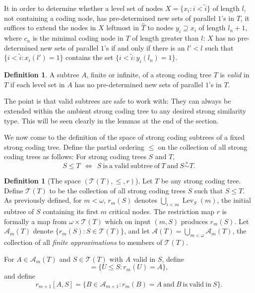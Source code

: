 \documentclass{amsart}
\theoremstyle{remark}
\theoremstyle{definition}
\newtheorem{defn}[thm]{Definition}
\theoremstyle{remark}
\newcommand{\om}{\omega}
\newcommand{\contains}{\supseteq}
\DeclareMathOperator{\Lev}{Lev}
\newcommand{\ssim}{\stackrel{s}{\sim}}
\begin{document}
It in order to determine whether  a level set of nodes $X=\{x_i:i<\tilde{i}\}$ of length $l$, not containing a coding node,  has pre-determined new sets of  parallel $1$'s in $T$,
it
suffices to extend the nodes in $X$
 leftmost in $\widehat{T}$ to nodes $y_i\contains x_i$ of   length $l_n+1$, where $c_n$ is the
minimal
 coding node in $T$ of length greater than $l$:
 $X$
 has no pre-determined new sets of  parallel $1$'s
 if and only if
 there is an $l'<l$ such that
$\{i<\tilde{i}:x_i(l')=1\}$ contains the set  $\{i<\tilde{i}:y_i(l_n)=1\}$.




\begin{defn}\label{defn.valid}
A subtree  $A$, finite or infinite, of a strong coding tree $T$ is {\em valid} in $T$ if
 each level set in $A$ has no pre-determined new sets of parallel $1$'s in $T$.
\end{defn}



The  point is that valid subtrees are safe to work with:
They can always be extended within the ambient strong coding tree to any desired strong similarity type.
This will be seen clearly in the lemmas at the end of the section.



We now come to the definition of the space of strong coding subtrees of a fixed strong coding tree.
Define the
 partial ordering  $\le$  on the collection of all strong coding trees  as follows:
For  strong coding trees $S$ and $T$,
\begin{equation}
 S\le T\ \  \Longleftrightarrow\ \  S \mathrm{\ is\ a\  valid\ subtree\ of\ }T\mathrm{\ and\ }  S\ssim T.
\end{equation}


\begin{defn}[The space $(\mathcal{T}(T),\le,r)$]\label{AT}
Let $T$ be any  strong coding  tree.
Define  $\mathcal{T}(T)$  to be the collection of all
strong coding trees $S$ such that $S\le T$.
As previously defined, for $m<\om$,
$r_m(S)$ denotes $\bigcup_{i<m}\Lev_S(m)$,
 the initial subtree of $S$ containing its first $m$ critical nodes.
The restriction map $r$ is formally a map from $\om\times \mathcal{T}(T)$ which on  input $(m,S)$ produces $r_m(S)$.
Let
$\mathcal{A}_m(T)$ denote $\{r_m(S):S\in\mathcal{T}(T)\}$, and let
$\mathcal{A}(T)=\bigcup_{m<\om}\mathcal{A}_m(T)$,
the collection of all {\em finite approximations} to members of $\mathcal{T}(T)$.


For $A\in\mathcal{A}_m(T)$ and
$S\in\mathcal{T}(T)$ with $A$ valid in $S$,
define
\begin{equation}
[A,S]=\{U\le S: r_m(U)=A\},
\end{equation}
and define
\begin{equation}
r_{m+1}[A,S]=\{B\in \mathcal{A}_{m+1}:
r_m(B)=A\mathrm{\ and \ }B\mathrm{\ is \ valid\ in\ }S\}.
\end{equation}
\end{defn}
\end{document}
